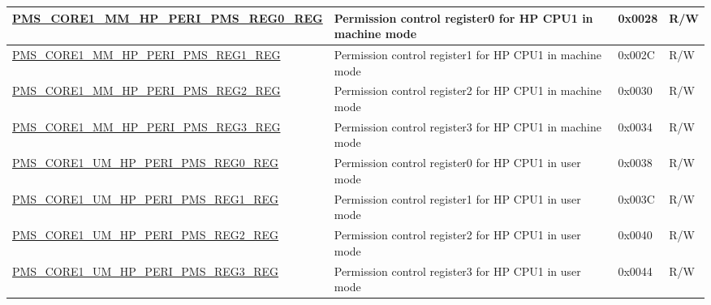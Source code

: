 \begin{longtable}{ | L{7.2cm} | L{6cm} | L{1.3cm} | L{1cm} | }
\hyperref[regdesc:PMSCORENMMHPPERIPMSREG0REG]{PMS\_CORE1\_MM\_HP\_PERI\_PMS\_REG0\_REG} & Permission control register0 for HP CPU1 in machine mode & 0x0028 & R/W \\ \hline
\hyperref[regdesc:PMSCORENMMHPPERIPMSREG1REG]{PMS\_CORE1\_MM\_HP\_PERI\_PMS\_REG1\_REG} & Permission control register1 for HP CPU1 in machine mode & 0x002C & R/W \\ \hline
\hyperref[regdesc:PMSCORENMMHPPERIPMSREG2REG]{PMS\_CORE1\_MM\_HP\_PERI\_PMS\_REG2\_REG} & Permission control register2 for HP CPU1 in machine mode & 0x0030 & R/W \\ \hline
\hyperref[regdesc:PMSCORENMMHPPERIPMSREG3REG]{PMS\_CORE1\_MM\_HP\_PERI\_PMS\_REG3\_REG} & Permission control register3 for HP CPU1 in machine mode & 0x0034 & R/W \\ \hline
\hyperref[regdesc:PMSCORENUMHPPERIPMSREG0REG]{PMS\_CORE1\_UM\_HP\_PERI\_PMS\_REG0\_REG} & Permission control register0 for HP CPU1 in user mode & 0x0038 & R/W \\ \hline
\hyperref[regdesc:PMSCORENUMHPPERIPMSREG1REG]{PMS\_CORE1\_UM\_HP\_PERI\_PMS\_REG1\_REG} & Permission control register1 for HP CPU1 in user mode & 0x003C & R/W \\ \hline
\hyperref[regdesc:PMSCORENUMHPPERIPMSREG2REG]{PMS\_CORE1\_UM\_HP\_PERI\_PMS\_REG2\_REG} & Permission control register2 for HP CPU1 in user mode & 0x0040 & R/W \\ \hline
\hyperref[regdesc:PMSCORENUMHPPERIPMSREG3REG]{PMS\_CORE1\_UM\_HP\_PERI\_PMS\_REG3\_REG} & Permission control register3 for HP CPU1 in user mode & 0x0044 & R/W \\ \hline
\end{longtable}
